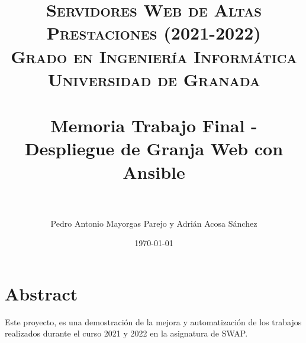 


\title{
\normalfont \normalsize
\textsc{\textbf{Servidores Web de Altas Prestaciones (2021-2022)} \\ Grado en Ingeniería Informática \\ Universidad de Granada} \\ [25pt] %
\horrule{0.5pt} \\[0.4cm] %
\huge Memoria Trabajo Final - Despliegue de Granja Web con Ansible\\ %
\horrule{2pt} \\[0.5cm] %
}

\graphicspath{ {img/} }

\author{Pedro Antonio Mayorgas Parejo y Adrián Acosa Sánchez} %

\date{\normalsize\today} %




\maketitle %

\newpage %

\tableofcontents %

\newpage


\section{Abstract}

Este proyecto, es una demostración de la mejora y automatización de los trabajos realizados durante el curso 2021 y 2022 en la asignatura de SWAP.
\vspace{5mm}

